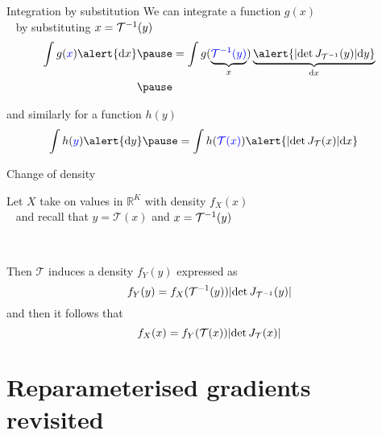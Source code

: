 \documentclass[14pt,dvipsnames]{beamer}
\newcommand{\balert}[1]{\textcolor{blue}{#1}}
\begin{document}
\begin{frame}{Integration by substitution}	
	We can integrate a function $g(x)$ \\
	~ by substituting $x = { \mathcal T}^{-1}(y)$
	\begin{equation*}
	\begin{aligned}
		\int g(\balert{x}) \alert{\dd x} \pause &= \int g(\underbrace{\balert{\inv{\mathcal T}(y)}}_{x}) \underbrace{\alert{\djac{\inv{\mathcal T}}{y} \dd y}}_{\dd x} \\ \pause
	\end{aligned}
	\end{equation*}
	
	\vspace{-10pt}
	and similarly for a function $h(y)$
	\begin{equation*}
	\begin{aligned}
		\int h(\balert{y}) \alert{\dd y} \pause &= \int h(\balert{\mathcal T(x)}) \alert{\djac{\mathcal T}{x} \dd x}
	\end{aligned}
	\end{equation*} 

\end{frame}

\begin{frame}{Change of density}

Let $X$ take on values in $\mathbb R^K$ with density $f_X(x)$\\ \pause
~ and recall that $y = \mathcal T(x)$ and $x = {\mathcal T}^{-1}(y)$\\ \pause

~

Then $\mathcal T$ induces a density $f_Y(y)$ expressed as
\begin{equation*}
f_Y(y) = f_X({\mathcal T}^{-1}(y)) \abs{\det J_{{\mathcal T}^{-1}}(y)}
\end{equation*} \pause
and then it follows that
\begin{equation*}
f_X(x) = f_Y(\mathcal T(x)) \abs{\det J_{\mathcal T}(x)}
\end{equation*}

	
\end{frame}

\section{Reparameterised gradients revisited}
\end{document}
